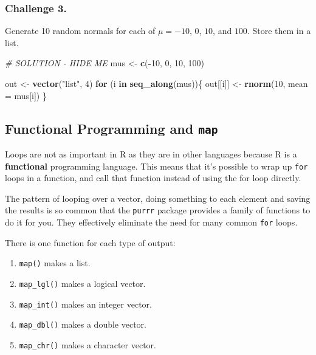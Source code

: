 \documentclass[]{book}
\newenvironment{Shaded}{\begin{snugshade}}{\end{snugshade}}
\newcommand{\KeywordTok}[1]{\textcolor[rgb]{0.13,0.29,0.53}{\textbf{#1}}}
\newcommand{\DataTypeTok}[1]{\textcolor[rgb]{0.13,0.29,0.53}{#1}}
\newcommand{\DecValTok}[1]{\textcolor[rgb]{0.00,0.00,0.81}{#1}}
\newcommand{\StringTok}[1]{\textcolor[rgb]{0.31,0.60,0.02}{#1}}
\newcommand{\CommentTok}[1]{\textcolor[rgb]{0.56,0.35,0.01}{\textit{#1}}}
\newcommand{\ControlFlowTok}[1]{\textcolor[rgb]{0.13,0.29,0.53}{\textbf{#1}}}
\newcommand{\OperatorTok}[1]{\textcolor[rgb]{0.81,0.36,0.00}{\textbf{#1}}}
\newcommand{\NormalTok}[1]{#1}
\providecommand{\tightlist}{%
  \setlength{\itemsep}{0pt}\setlength{\parskip}{0pt}}
\begin{document}
\subsubsection*{Challenge 3.}\label{challenge-3.-8}

Generate 10 random normals for each of \(\mu = -10\), \(0\), \(10\), and
\(100\). Store them in a list.

\begin{Shaded}
\begin{Highlighting}[]
\CommentTok{# SOLUTION - HIDE ME}
\NormalTok{mus <-}\StringTok{ }\KeywordTok{c}\NormalTok{(}\OperatorTok{-}\DecValTok{10}\NormalTok{, }\DecValTok{0}\NormalTok{, }\DecValTok{10}\NormalTok{, }\DecValTok{100}\NormalTok{)}

\NormalTok{out <-}\StringTok{ }\KeywordTok{vector}\NormalTok{(}\StringTok{"list"}\NormalTok{, }\DecValTok{4}\NormalTok{)}
\ControlFlowTok{for}\NormalTok{ (i }\ControlFlowTok{in} \KeywordTok{seq_along}\NormalTok{(mus))\{}
\NormalTok{  out[[i]] <-}\StringTok{ }\KeywordTok{rnorm}\NormalTok{(}\DecValTok{10}\NormalTok{, }\DataTypeTok{mean =}\NormalTok{ mus[i])}
\NormalTok{\}}
\end{Highlighting}
\end{Shaded}

\subsection{\texorpdfstring{Functional Programming and
\texttt{map}}{Functional Programming and map}}\label{functional-programming-and-map}

Loops are not as important in R as they are in other languages because R
is a \textbf{functional} programming language. This means that it's
possible to wrap up \texttt{for} loops in a function, and call that
function instead of using the for loop directly.

The pattern of looping over a vector, doing something to each element
and saving the results is so common that the \texttt{purrr} package
provides a family of functions to do it for you. They effectively
eliminate the need for many common \texttt{for} loops.

There is one function for each type of output:

\begin{enumerate}
\def\labelenumi{\arabic{enumi}.}
\tightlist
\item
  \texttt{map()} makes a list.
\item
  \texttt{map\_lgl()} makes a logical vector.
\item
  \texttt{map\_int()} makes an integer vector.
\item
  \texttt{map\_dbl()} makes a double vector.
\item
  \texttt{map\_chr()} makes a character vector.
\end{enumerate}
\end{document}
